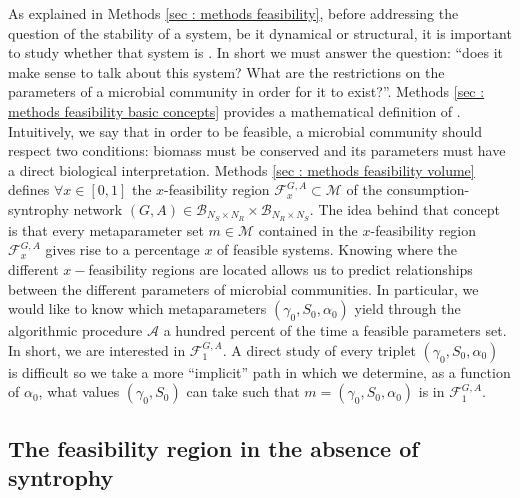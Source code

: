 \documentclass[12pt, titlepage]{report}
\begin{document}
As explained in Methods \ref{sec : methods feasibility}, before addressing the question of the stability of a system, be it dynamical or structural, it is important to study whether that system is . In short we must answer the question: ``does it make sense to talk about this system? What are the restrictions on the parameters of a microbial community in order for it to exist?''.
 Methods \ref{sec : methods feasibility basic concepts} provides a mathematical definition of . Intuitively, we say that in order to be feasible, a microbial community should respect two conditions: biomass must be conserved and its parameters must have a direct biological interpretation. Methods \ref{sec : methods feasibility volume} defines $\forall x \in [0,1]$ the $x$-feasibility region $\mathcal{F}^{G,A}_x \subset \mathcal{M}$ of the consumption-syntrophy network $(G, A) \in \mathcal{B}_{N_S \times N_R} \times  \mathcal{B}_{N_R \times N_S}$. The idea behind that concept is that every metaparameter set $m \in \mathcal{M}$ contained in the $x$-feasibility region $\mathcal{F}^{G,A}_x$ gives rise to a percentage $x$ of feasible systems. Knowing where the different $x-$feasibility regions are located allows us to predict relationships between the different parameters of microbial communities. In particular, we would like to know which metaparameters $(\gamma_0, S_0, \alpha_0)$ yield through the algorithmic procedure $\mathcal{A}$ a hundred percent of the time a feasible parameters set. In short, we are interested in $\mathcal{F}^{G,A}_1$. A direct study of every triplet $(\gamma_0, S_0, \alpha_0)$ is difficult so we take a more ``implicit'' path in which we  determine, as a function of $\alpha_0$, what values $(\gamma_0, S_0)$ can take such that $m=(\gamma_0, S_0, \alpha_0)$ is in $\mathcal{F}^{G,A}_1$.


\subsection{The feasibility region in the absence of syntrophy}\label{sec : feasibility without syntrophy}
\end{document}
